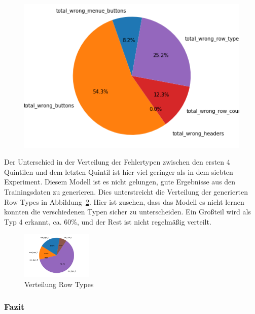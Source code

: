 \documentclass[pdftex,a4paper,halfparskip, article]{scrartcl}
\begin{document}
\begin{figure}
\begin{minipage}{.33\textwidth}
  \label{fig:fehler_beste80_bin12}
\end{minipage}
\begin{minipage}{.33\textwidth}
  \centering
   \includegraphics[width=1\linewidth]{predictions_bin12_p80_error_types_pie_chart}
  \label{fig:fehler_schlechteste20_bin12}
\end{minipage}%
\end{figure}

Der Unterschied in der Verteilung der Fehlertypen zwischen den ersten 4 Quintilen und dem letzten Quintil ist hier viel geringer als in dem siebten Experiment. Diesem Modell ist es nicht gelungen, gute Ergebnisse aus den Trainingsdaten zu generieren. Dies unterstreicht die Verteilung der generierten Row Types in Abbildung~\ref{fig:bin12_row_type}. Hier ist zusehen, dass das Modell es nicht lernen konnten die verschiedenen Typen sicher zu unterscheiden. Ein Großteil wird als Typ 4 erkannt, ca. 60\%, und der Rest ist nicht regelmäßig verteilt.

\begin{figure}[h]
\centering
\includegraphics[width=0.3\textwidth]{predictions_bin12_predicted_row_type_distribution}
\caption{Verteilung Row Types}
\label{fig:bin12_row_type}
\end{figure}

\subsubsection*{Fazit}
\end{document}
